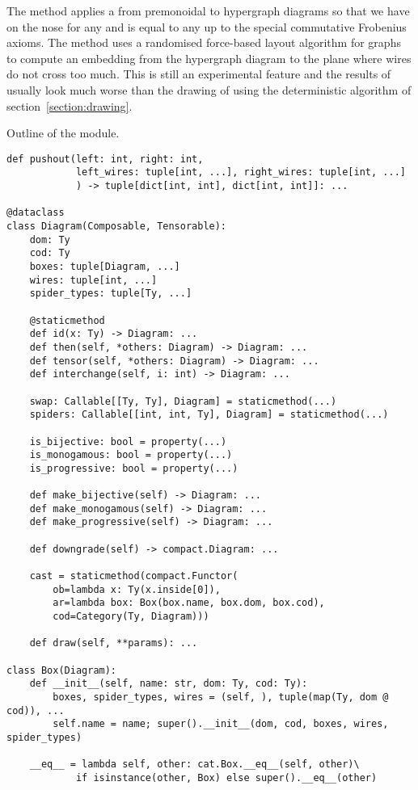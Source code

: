 The method  applies a  from premonoidal to hypergraph diagrams so that we have   on the nose for any  and  is equal to any   up to the special commutative Frobenius axioms.
The  method uses a randomised force-based layout algorithm for graphs to compute an embedding from the hypergraph diagram to the plane where wires do not cross too much.
This is still an experimental feature and the results of  usually look much worse than the drawing of  using the deterministic algorithm of section~\ref{section:drawing}.

\begin{python}\label{listing:discopy-hypergraph}
{\normalfont Outline of the  module.}

\begin{verbatim}
def pushout(left: int, right: int,
            left_wires: tuple[int, ...], right_wires: tuple[int, ...]
            ) -> tuple[dict[int, int], dict[int, int]]: ...

@dataclass
class Diagram(Composable, Tensorable):
    dom: Ty
    cod: Ty
    boxes: tuple[Diagram, ...]
    wires: tuple[int, ...]
    spider_types: tuple[Ty, ...]

    @staticmethod
    def id(x: Ty) -> Diagram: ...
    def then(self, *others: Diagram) -> Diagram: ...
    def tensor(self, *others: Diagram) -> Diagram: ...
    def interchange(self, i: int) -> Diagram: ...

    swap: Callable[[Ty, Ty], Diagram] = staticmethod(...)
    spiders: Callable[[int, int, Ty], Diagram] = staticmethod(...)

    is_bijective: bool = property(...)
    is_monogamous: bool = property(...)
    is_progressive: bool = property(...)

    def make_bijective(self) -> Diagram: ...
    def make_monogamous(self) -> Diagram: ...
    def make_progressive(self) -> Diagram: ...

    def downgrade(self) -> compact.Diagram: ...

    cast = staticmethod(compact.Functor(
        ob=lambda x: Ty(x.inside[0]),
        ar=lambda box: Box(box.name, box.dom, box.cod),
        cod=Category(Ty, Diagram)))

    def draw(self, **params): ...

class Box(Diagram):
    def __init__(self, name: str, dom: Ty, cod: Ty):
        boxes, spider_types, wires = (self, ), tuple(map(Ty, dom @ cod)), ...
        self.name = name; super().__init__(dom, cod, boxes, wires, spider_types)

    __eq__ = lambda self, other: cat.Box.__eq__(self, other)\
            if isinstance(other, Box) else super().__eq__(other)
\end{verbatim}
\end{python}


